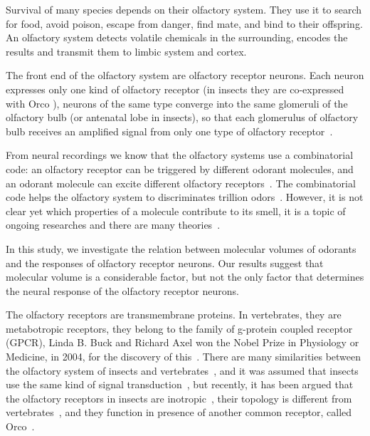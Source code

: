 \documentclass[11pt]{paper} %
\begin{document}
Survival of many species depends on their olfactory system. 
They use it  to search for food, 
avoid poison, 
escape from danger, 
find mate, 
and bind to their offspring.
An olfactory system detects volatile chemicals in the surrounding, 
encodes the results and transmit them to limbic system and cortex.

The front end of the olfactory system are olfactory receptor neurons.  
Each neuron expresses only one kind of olfactory receptor (in insects they are co-expressed with Orco \cite{Larsson2004}),
neurons of the same type converge into the same glomeruli of the olfactory bulb (or antenatal lobe in insects),
so that each glomerulus of olfactory bulb receives an amplified signal from only one type of olfactory receptor~\cite{root2007,Carey2011,Vosshall2000,Couto2005,fishilevich2005,gao2000,wang1998,mombaerts1996,vassar1994}.

From neural recordings we know that the olfactory systems use a combinatorial code: 
an olfactory receptor can be triggered by different odorant molecules, 
and an odorant molecule can excite different olfactory receptors~\cite{Malnic2000}.
The combinatorial code helps the olfactory system to discriminates trillion odors~\cite{Bushdid2014}.
However, it is not clear yet which properties of a molecule contribute to its smell,
it is a topic of ongoing researches and there are many theories~\cite{Turin,Keller2004,Araneda2000,Brookes2007,Franco2011,Pelz2006,Gabler2013,Schmuker2007,Haddad2008,Snitz2013,Yablonka2012,gane2013}.

In this study, 
we investigate the relation between molecular volumes of odorants and the responses of olfactory receptor neurons. 
Our results suggest that molecular volume is a considerable factor, 
but not the only factor that determines the neural response of the olfactory receptor neurons.

The olfactory receptors are transmembrane proteins.
In vertebrates, they are metabotropic receptors, they belong to the family of g-protein coupled receptor (GPCR), 
Linda B. Buck and Richard Axel won the Nobel Prize in Physiology or Medicine, in 2004, 
for the discovery of this~\cite{Buck1991}.
There are many similarities between the olfactory system of insects and vertebrates~\cite{Wilson2014,Kaupp2010}, 
and it was assumed that insects use the same kind of signal transduction~\cite{Brody2000,Hill04102002}, 
but recently, it has been argued that the olfactory receptors in insects are inotropic~\cite{Sato2008,Wicher2008,Nagel2011,Rong2011}, 
their topology is different from vertebrates~\cite{Benton2007,Smart2008},
and they function in presence of another common receptor, called Orco~\cite{Larsson2004}.
\end{document}
